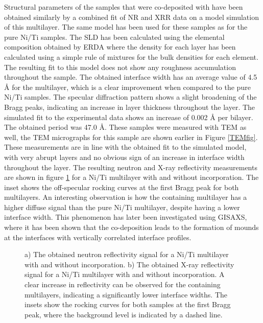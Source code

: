 Structural parameters of the samples that were co-deposited with \BC have been obtained similarly by a combined fit of NR and XRR data on a model simulation of this multilayer. The same model has been used for these samples as for the pure Ni/Ti samples. The SLD has been calculated using the elemental composition obtained by ERDA where the density for each layer has been calculated using a simple rule of mixtures for the bulk densities for each element. The resulting fit to this model does not show any roughness accumulation throughout the sample. The obtained interface width has an average value of 4.5 Å for the multilayer, which is a clear improvement when compared to the pure Ni/Ti samples. The specular diffraction pattern shows a slight broadening of the Bragg peaks, indicating an increase in layer thickness throughout the layer. The simulated fit to the experimental data shows an increase of 0.002 Å per bilayer. The obtained period was 47.0 Å. These samples were measured with TEM as well, the TEM micrographs for this sample are shown earlier in Figure \ref{TEMfig}. These measurements are in line with the obtained fit to the simulated model, with very abrupt layers and no obvious sign of an increase in interface width throughout the layer. The resulting neutron
and X-ray reflectivity measurements are shown in figure \ref{neutronimprovment} for a Ni/Ti multilayer with and without \BC incorporation. The inset shows the off-specular rocking curves at the first Bragg peak for both multilayers. An interesting observation is how the \BC containing multilayer has a higher diffuse signal than the pure Ni/Ti multilayer, despite having a lower interface width. This phenomenon has later been investigated using GISAXS, where it has been shown that the \BC co-deposition leads to the formation of mounds at the interfaces with vertically correlated interface profiles.
\begin{figure}[b]
	\centering
	\def\svgwidth{\textwidth}
	
	\caption{a) The obtained neutron reflectivity signal for a Ni/Ti multilayer with and without \BC incorporation. b) The obtained X-ray reflectivity signal for a Ni/Ti multilayer with and without \BC incorporation. A clear increase in reflectivity can be observed for the \BC containing multilayers, indicating a significantly lower interface widths. The insets show the rocking curves for both samples at the first Bragg peak, where the background level is indicated by a dashed line.}
	\label{neutronimprovment}
\end{figure}
\clearpage
